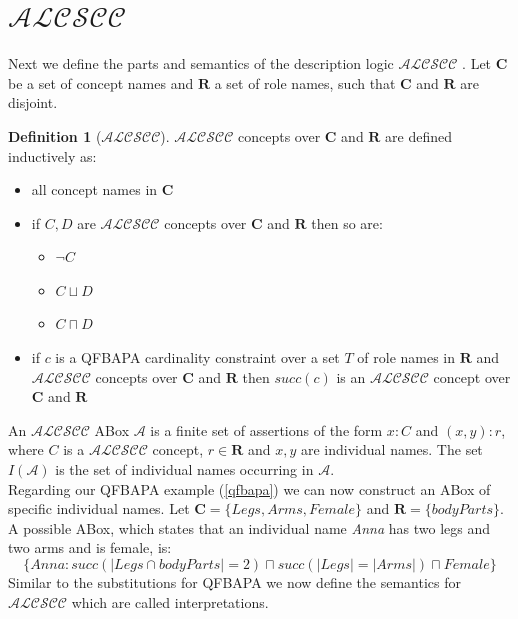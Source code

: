 \documentclass{book}
\theoremstyle{break}
\theoremstyle{definition}
\newtheorem{mydef}{Definition}
\begin{document}
\section{$\mathcal{ALCSCC}$} \label{alcscc}
Next we define the parts and semantics of the description logic $\mathcal{ALCSCC}$ \cite{4}. Let $\mathbf{C}$ be a set of concept names and $\mathbf{R}$ a set of role names, such that $\mathbf{C}$ and $\mathbf{R}$ are disjoint.
\begin{mydef}[$\mathcal{ALCSCC}$]
$\mathcal{ALCSCC}$ concepts over $\mathbf{C}$ and $\mathbf{R}$ are defined inductively as:
\begin{itemize}
\item all concept names in $\mathbf{C}$
\item if $C,D$ are $\mathcal{ALCSCC}$ concepts over $\mathbf{C}$ and $\mathbf{R}$ then so are:
\begin{itemize}
\item $\neg C$
\item $C\sqcup D$ 
\item $C\sqcap D$
\end{itemize}
\item if $c$ is a QFBAPA cardinality constraint over a set $T$ of role names in $\mathbf{R}$ and $\mathcal{ALCSCC}$ concepts over $\mathbf{C}$ and $\mathbf{R}$ then $succ(c)$ is an $\mathcal{ALCSCC}$ concept over $\mathbf{C}$ and $\mathbf{R}$
\end{itemize}
\end{mydef}
An $\mathcal{ALCSCC}$ ABox $\mathcal{A}$ is a finite set of assertions of the form $x:C$ and $(x,y):r$, where $C$ is a $\mathcal{ALCSCC}$ concept, $r\in\mathbf{R}$ and $x,y$ are individual names. The set $I(\mathcal{A})$ is the set of individual names occurring in $\mathcal{A}$.\\
Regarding our QFBAPA example (\ref{qfbapa}) we can now construct an ABox of specific individual names. Let $\mathbf{C}=\{Legs, Arms, Female\}$ and $\mathbf{R}=\{bodyParts\}$. A possible ABox, which states that an individual name \textit{Anna} has two legs and two arms and is female, is:
\begin{equation}
\{Anna:succ(|Legs\cap bodyParts|=2)\sqcap succ(|Legs|=|Arms|)\sqcap Female\}
\end{equation}
Similar to the substitutions for QFBAPA we now define the semantics for $\mathcal{ALCSCC}$ which are called interpretations.
\end{document}
